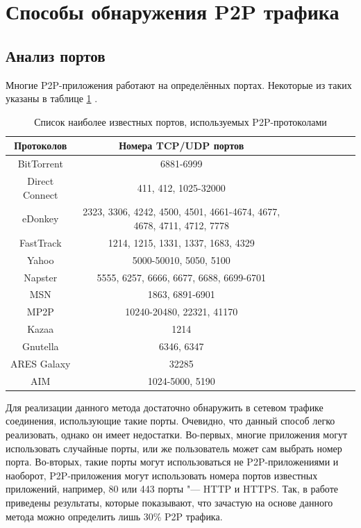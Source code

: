 \documentclass[bachelor, och, coursework]{SCWorks}
\begin{document}
\section{Способы обнаружения P2P трафика}
\subsection{Анализ портов}
Многие P2P-приложения работают на определённых портах. 
Некоторые из таких указаны в таблице \ref{table:p2p-ports} \cite{p2p-list}.

\begin{table}[H]
    \caption{Список наиболее известных портов, используемых P2P-протоколами}
    \label{table:p2p-ports}
    \begin{center}
    {\small
    \begin{tabular}{|c|c|c|c|c|c|c|c|c|}
        \hline
    Протоколов   & Номера TCP/UDP портов \\ \hline
    BitTorrent      & 6881-6999  \\ \hline
    Direct Connect  & 411, 412, 1025-32000  \\ \hline
    eDonkey         & 2323, 3306, 4242, 4500, 4501, 4661-4674, 4677, 4678, 4711, 4712, 7778  \\ \hline
    FastTrack       & 1214, 1215, 1331, 1337, 1683, 4329  \\ \hline
    Yahoo           & 5000-50010, 5050, 5100  \\ \hline
    Napster         & 5555, 6257, 6666, 6677, 6688, 6699-6701  \\ \hline
    MSN             & 1863, 6891-6901 \\ \hline
    MP2P            & 10240-20480, 22321, 41170  \\ \hline
    Kazaa           & 1214  \\ \hline
    Gnutella        & 6346, 6347  \\ \hline
    ARES Galaxy     & 32285  \\ \hline
    AIM             & 1024-5000, 5190  \\ \hline
    \end{tabular}
    }
    \end{center}
\end{table}

Для реализации данного метода достаточно обнаружить в сетевом трафике соединения, использующие такие порты.
Очевидно, что данный способ легко реализовать, однако он имеет недостатки. Во-первых, многие приложения могут
использовать случайные порты, или же пользователь может сам выбрать номер порта. Во-вторых, такие порты могут использоваться не P2P-приложениями и наоборот, P2P-приложения могут использовать номера портов известных приложений, например, 80 или 443 порты "--- HTTP и HTTPS. Так, в работе \cite{30percent}
приведены результаты, которые показывают, что зачастую на основе данного метода можно определить лишь 30\% P2P трафика.
\end{document}
